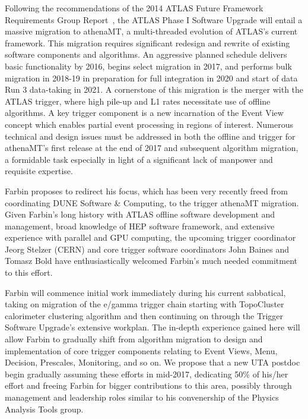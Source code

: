 \label{sec:af_trigger}
Following the recommendations of the 2014 ATLAS Future Framework
Requirements Group Report~\cite{ATL-SOFT-PUB-2016-001}, the ATLAS Phase I Software Upgrade
will entail a massive migration to athenaMT, a multi-threaded
evolution of ATLAS's current framework. This migration requires
significant redesign and rewrite of existing software components and
algorithms. An aggressive planned schedule delivers basic
functionality by 2016, begins select migration in 2017, and performs
bulk migration in 2018-19 in preparation for full integration in 2020
and start of data Run 3 data-taking in 2021. A cornerstone of this
migration is the merger with the ATLAS trigger, where high pile-up and
L1 rates necessitate use of offline algorithms. A key trigger
component is a new incarnation of the Event View concept which enables
partial event processing in regions of interest. Numerous technical
and design issues must be addressed in both the offline and trigger
for athenaMT's first release at the end of 2017 and subsequent
algorithm migration, a formidable task especially in light of a
significant lack of manpower and requisite expertise.


Farbin proposes to redirect his focus, which has been very recently
freed from coordinating DUNE Software \& Computing, to the trigger
athenaMT migration. Given Farbin's long history with ATLAS offline
software development and management, broad knowledge of HEP software
framework, and extensive experience with parallel and GPU computing,
the upcoming trigger coordinator Jeorg Stelzer (CERN) and core trigger
software coordinators John Baines and Tomasz Bold have
enthusiastically welcomed Farbin's much needed commitment to this
effort. 

Farbin will commence initial work immediately during his current
sabbatical, taking on migration of the e/gamma trigger chain starting
with TopoCluster calorimeter clustering algorithm and then continuing
on through the Trigger Software Upgrade's extensive
workplan. The in-depth experience gained here will allow
Farbin to gradually shift from algorithm migration to design and
implementation of core trigger components relating to Event Views,
Menu, Decision, Prescales, Monitoring, and so on.  We propose that a
new UTA postdoc begin gradually assuming these efforts in mid-2017,
dedicating 50\% of his/her effort and freeing Farbin for bigger
contributions to this area, possibly through management and leadership
roles similar to his convenership of the Physics Analysis Tools group.

